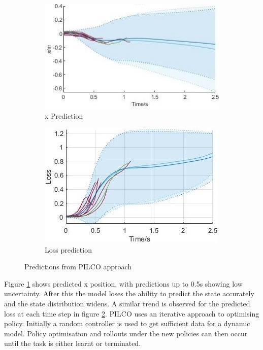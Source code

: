 \documentclass[twoside,twocolumn,12pt]{article}
\begin{document}
\begin{figure}[h]
  \centering
  \begin{subfigure}[t]{0.5\textwidth}
    \includegraphics[width=\linewidth]{u2}
  \caption{x Prediction} 
  \label{sub:ffffffs}
  \end{subfigure}
  \begin{subfigure}[t]{0.5\textwidth}
    \includegraphics[width=\linewidth]{loss2}
  \caption{Loss prediction}
  \label{sub:ffs}
  \end{subfigure}
  \caption{Predictions from PILCO approach}
  \label{fig:pilco}
\end{figure}

Figure \ref{sub:ffffffs} shows predicted x position, with predictions up to 0.5s showing low uncertainty. After this the model loses the ability to predict the state accurately and the state distribution widens. 
A similar trend is observed for the predicted loss at each time step in figure \ref{sub:ffs}.
\newline
PILCO uses an iterative approach to optimising policy. Initially a random controller is used to get sufficient data for a dynamic model. Policy optimisation and rollouts under the new policies can then occur until the task is either learnt or terminated. 
\end{document}
